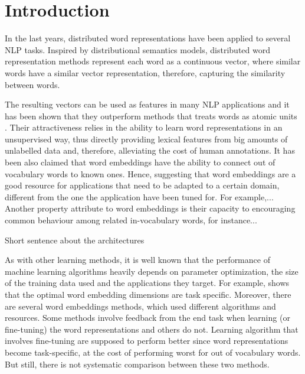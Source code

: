 \section{Introduction}
In the last years, distributed word representations
have been applied to several NLP tasks.
Inspired by distributional semantics models, distributed word
representation methods represent each word as a continuous vector, where similar words have a similar vector representation, therefore, capturing the similarity between words.

The resulting vectors can be used as features in many NLP applications and it has been shown that they outperform methods that treats words as atomic units \cite{}.  
Their attractiveness relies in the ability to learn word representations in an unsupervised way, thus directly providing lexical features from big amounts of unlabelled data 
and, therefore, alleviating the cost of human annotations.
It has been also claimed that word embeddings
have the ability to connect out of vocabulary words to known ones.
Hence, suggesting that word embeddings are a good resource 
for applications that need to be adapted to a certain domain, 
different from the one the application have been tuned for.
For example,...
Another property attribute to word embeddings is their 
capacity to encouraging common behaviour among related in-vocabulary words, for instance...

{\color{red}Short sentence about the architectures}

As with other learning methods, it is well known that
the performance of machine learning algorithms heavily depends on
parameter optimization, the size of the training data used and the applications they target.
For example, \cite{turian2010word} shows that the optimal word embedding dimensions are task specific.
Moreover, there are several word embeddings methods, which used different algorithms and resources. 
Some methods involve feedback from the end task when learning (or fine-tuning) the word representations and others do not. 
Learning algorithm that involves fine-tuning are supposed
to perform better since word representations become
task-specific, at the cost of performing worst for out of vocabulary 
words. But still, there is not systematic comparison between
these two methods. 



